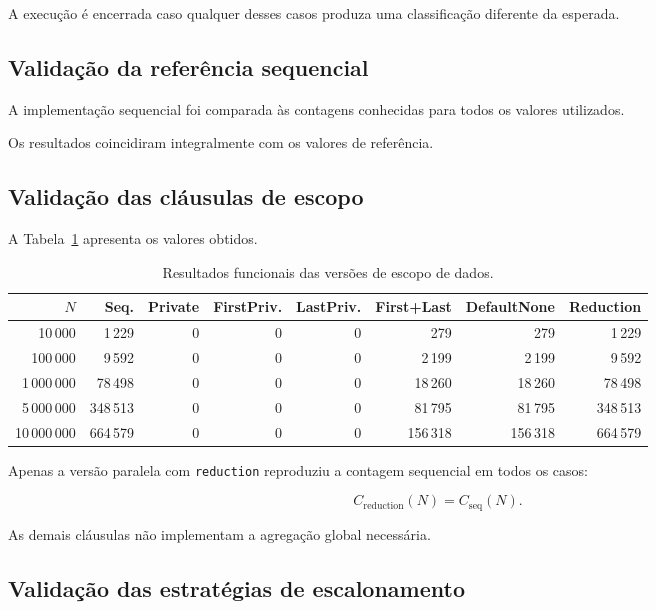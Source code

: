 A execução é encerrada caso qualquer desses casos produza uma classificação
diferente da esperada.


\subsection{Validação da referência sequencial}

A implementação sequencial foi comparada às contagens conhecidas para todos
os valores utilizados.

Os resultados coincidiram integralmente com os valores de referência.


\subsection{Validação das cláusulas de escopo}

A Tabela~\ref{tab:atvd07-validacao-dados} apresenta os valores obtidos.

\begin{table}[htbp]
\centering
\caption{Resultados funcionais das versões de escopo de dados.}
\label{tab:atvd07-validacao-dados}
\scriptsize
\begin{tabular}{|r|r|r|r|r|r|r|r|}
\hline
\textbf{\(N\)} &
\textbf{Seq.} &
\textbf{Private} &
\textbf{FirstPriv.} &
\textbf{LastPriv.} &
\textbf{First+Last} &
\textbf{DefaultNone} &
\textbf{Reduction} \\
\hline
10\,000
& 1\,229 & 0 & 0 & 0 & 279 & 279 & 1\,229 \\
\hline
100\,000
& 9\,592 & 0 & 0 & 0 & 2\,199 & 2\,199 & 9\,592 \\
\hline
1\,000\,000
& 78\,498 & 0 & 0 & 0 & 18\,260 & 18\,260 & 78\,498 \\
\hline
5\,000\,000
& 348\,513 & 0 & 0 & 0 & 81\,795 & 81\,795 & 348\,513 \\
\hline
10\,000\,000
& 664\,579 & 0 & 0 & 0 & 156\,318 & 156\,318 & 664\,579 \\
\hline
\end{tabular}
\end{table}

Apenas a versão paralela com \texttt{reduction} reproduziu a contagem
sequencial em todos os casos:

\[
C_{\mathrm{reduction}}(N)
=
C_{\mathrm{seq}}(N).
\]

As demais cláusulas não implementam a agregação global necessária.


\subsection{Validação das estratégias de escalonamento}

